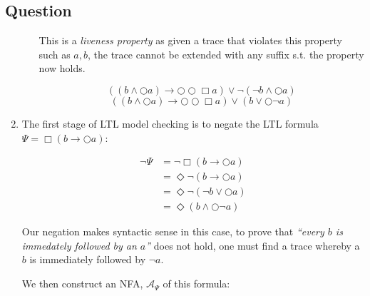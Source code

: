 \documentclass[12pt,a4paper]{article}
\newcounter{question}\setcounter{question}{1}
\newenvironment{question}{%
\subsection*{Question \arabic{question}}}%
{\stepcounter{question}}
\begin{document}
\begin{question}
\begin{enumerate}[label= (\alph*)]
\begin{enumerate}[label= (\roman*)]
                  This is a \textit{liveness property} as given a trace that violates this property such as $a,b$, the trace cannot be extended with any suffix s.t. the property now holds.

                  \[
                  ((b \wedge \bigcirc a ) \rightarrow \bigcirc \bigcirc \Box a) \vee \neg (\neg b \wedge \bigcirc a)
                  \]
                  \[
                  ((b \wedge \bigcirc a ) \rightarrow \bigcirc \bigcirc \Box a) \vee (b \vee \bigcirc \neg a)
                  \]



          \end{enumerate}
    \item
          The first stage of LTL model checking is to negate the LTL formula $\Psi = \Box(b \rightarrow \bigcirc a)$:

          \begin{align*}
            \neg \Psi &= \neg\Box(b \rightarrow \bigcirc a) \\
                &= \Diamond \neg( b \rightarrow \bigcirc a ) \\
                &= \Diamond \neg (\neg b \vee \bigcirc a)\\
                &= \Diamond ( b \wedge \bigcirc \neg a )
          \end{align*}

          Our negation makes syntactic sense in this case, to prove that \textit{``every $b$ is immedately followed by an $a$''} does not hold, one must find a trace whereby a $b$ is immediately followed by $\neg a$.

          We then construct an NFA, $\mathcal{A}_{\Psi}$ of this formula:

          \begin{center}
          \end{center}



\end{enumerate}
\end{question}
\end{document}
